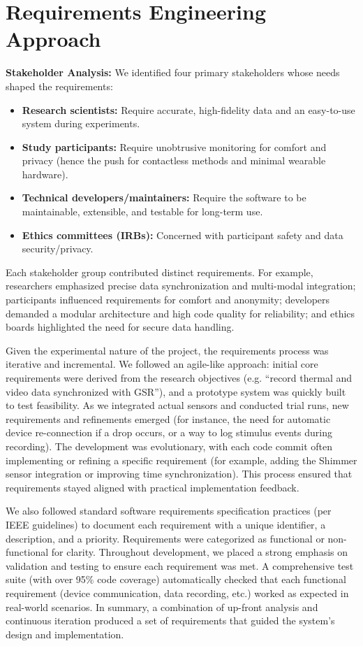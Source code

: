\section{Requirements Engineering Approach}

\textbf{Stakeholder Analysis:} We identified four primary stakeholders whose needs shaped the requirements:

\begin{itemize}
\item \textbf{Research scientists:} Require accurate, high-fidelity data and an easy-to-use system during experiments.
\item \textbf{Study participants:} Require unobtrusive monitoring for comfort and privacy (hence the push for contactless methods and minimal wearable hardware).
\item \textbf{Technical developers/maintainers:} Require the software to be maintainable, extensible, and testable for long-term use.
\item \textbf{Ethics committees (IRBs):} Concerned with participant safety and data security/privacy.
\end{itemize}

Each stakeholder group contributed distinct requirements. For example, researchers emphasized precise data synchronization and multi-modal integration; participants influenced requirements for comfort and anonymity; developers demanded a modular architecture and high code quality for reliability; and ethics boards highlighted the need for secure data handling.

Given the experimental nature of the project, the requirements process was iterative and incremental. We followed an agile-like approach: initial core requirements were derived from the research objectives (e.g. ``record thermal and video data synchronized with GSR''), and a prototype system was quickly built to test feasibility. As we integrated actual sensors and conducted trial runs, new requirements and refinements emerged (for instance, the need for automatic device re-connection if a drop occurs, or a way to log stimulus events during recording). The development was evolutionary, with each code commit often implementing or refining a specific requirement (for example, adding the Shimmer sensor integration or improving time synchronization). This process ensured that requirements stayed aligned with practical implementation feedback.

We also followed standard software requirements specification practices (per IEEE guidelines) to document each requirement with a unique identifier, a description, and a priority. Requirements were categorized as functional or non-functional for clarity. Throughout development, we placed a strong emphasis on validation and testing to ensure each requirement was met. A comprehensive test suite (with over 95\% code coverage) automatically checked that each functional requirement (device communication, data recording, etc.) worked as expected in real-world scenarios. In summary, a combination of up-front analysis and continuous iteration produced a set of requirements that guided the system's design and implementation.

